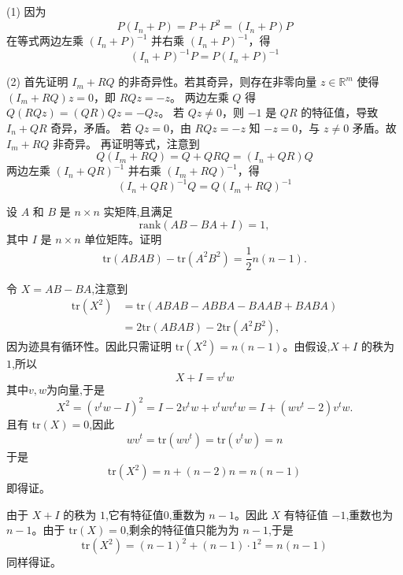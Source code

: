 \begin{questions}
\begin{solution}
(1)
因为
\[
P (I_n + P) = P + P^2 = (I_n + P) P
\]
在等式两边左乘 $(I_n + P)^{-1}$ 并右乘 $(I_n + P)^{-1}$，得
\[
(I_n + P)^{-1} P = P (I_n + P)^{-1}
\]

(2)
首先证明 $I_m + RQ$ 的非奇异性。若其奇异，则存在非零向量 $z \in \mathbb{R}^m$ 使得 $(I_m + RQ)z = 0$，即 $RQz = -z$。
两边左乘 $Q$ 得 $Q(RQz) = (QR)Qz = -Qz$。
若 $Qz \neq 0$，则 $-1$ 是 $QR$ 的特征值，导致 $I_n + QR$ 奇异，矛盾。
若 $Qz = 0$，由 $RQz = -z$ 知 $-z = 0$，与 $z \neq 0$ 矛盾。故 $I_m + RQ$ 非奇异。
再证明等式，注意到
\[
Q (I_m + RQ) = Q + QRQ = (I_n + QR) Q
\]
两边左乘 $(I_n + QR)^{-1}$ 并右乘 $(I_m + RQ)^{-1}$，得
\[
(I_n + QR)^{-1} Q = Q (I_m + RQ)^{-1}
\]
\end{solution}

    \question 设 $A$ 和 $B$ 是 $n \times n$ 实矩阵,且满足
    \[
    \mathrm{rank}(AB - BA + I) = 1,
    \]
    其中 $I$ 是 $n\times n$ 单位矩阵。证明
    \[
    \mathrm{tr}(ABAB) - \mathrm{tr}(A^2B^2) = \frac{1}{2}n(n-1).
    \]
    \begin{solution}
        令 $X = AB - BA$,注意到
        \begin{align*}
        \mathrm{tr}(X^2) &= \mathrm{tr}(ABAB - ABBA - BAAB + BABA) \\
        &= 2\mathrm{tr}(ABAB) - 2\mathrm{tr}(A^2B^2),
        \end{align*}
        因为迹具有循环性。因此只需证明 $\mathrm{tr}(X^2) = n(n-1)$。由假设,$X+I$ 的秩为 $1$,所以
        \[
        X+I = v^t w
        \]
        其中$v,w$为向量,于是
        \[
        X^2 = (v^t w - I)^2 = I - 2 v^t w + v^t w v^t w = I + (w v^t - 2)v^t w.
        \]
        且有 $\mathrm{tr}(X) = 0$,因此 
        \[
        w v^t=\mathrm{tr}(w v^t) = \mathrm{tr}(v^t w) = n
        \]
        于是
        \[
        \mathrm{tr}(X^2) = n + (n-2)n = n(n-1)
        \]
        即得证。
    \end{solution}
    \begin{solution}
        由于 $X+I$ 的秩为 $1$,它有特征值$0$,重数为 $n-1$。因此 $X$ 有特征值 $-1$,重数也为 $n-1$。由于 $\mathrm{tr}(X) = 0$,剩余的特征值只能为为 $n-1$,于是
        \[
        \mathrm{tr}(X^2) = (n-1)^2 + (n-1)\cdot 1^2 = n(n-1)
        \]
        同样得证。
    \end{solution}


\end{questions}
